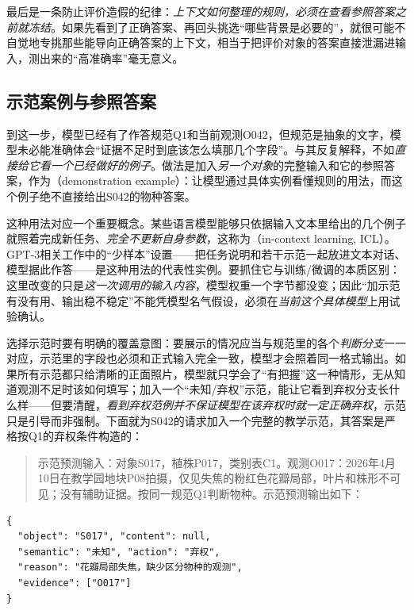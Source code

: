 最后是一条防止评价造假的纪律：\emph{上下文如何整理的规则，必须在查看参照答案之前就冻结}。如果先看到了正确答案、再回头挑选“哪些背景是必要的”，就很可能不自觉地专挑那些能导向正确答案的上下文，相当于把评价对象的答案直接泄漏进输入，测出来的“高准确率”毫无意义。

\Needspace{125mm}
\subsection{示范案例与参照答案}
\label{sec:knowledge-acquisition-demonstrations}

到这一步，模型已经有了作答规范Q1和当前观测O042，但规范是抽象的文字，模型未必能准确体会“证据不足时到底该怎么填那几个字段”。与其反复解释，不如\emph{直接给它看一个已经做好的例子}。做法是加入\emph{另一个对象}的完整输入和它的参照答案，作为（demonstration example）：让模型通过具体实例看懂规则的用法，而这个例子绝不直接给出S042的物种答案。

这种用法对应一个重要概念。某些语言模型能够只依据输入文本里给出的几个例子就照着完成新任务、\emph{完全不更新自身参数}，这称为（in-context learning, ICL）。GPT-3相关工作中的“少样本”设置——把任务说明和若干示范一起放进文本对话、模型据此作答——是这种用法的代表性实例。要抓住它与训练/微调的本质区别：这里改变的只是\emph{这一次调用的输入内容}，模型权重一个字节都没变；因此“加示范有没有用、输出稳不稳定”不能凭模型名气假设，必须在\emph{当前这个具体模型}上用试验确认。

选择示范时要有明确的覆盖意图：要展示的情况应当与规范里的各个\emph{判断分支}一一对应，示范里的字段也必须和正式输入完全一致，模型才会照着同一格式输出。如果所有示范都只给清晰的正面照片，模型就只学会了“有把握”这一种情形，无从知道观测不足时该如何填写；加入一个“未知/弃权”示范，能让它看到弃权分支长什么样——但要清醒，\emph{看到弃权范例并不保证模型在该弃权时就一定正确弃权}，示范只是引导而非强制。下面就为S042的请求加入一个完整的教学示范，其答案是严格按Q1的弃权条件构造的：

\begin{quote}
  示范预测输入：对象S017，植株P017，类别表C1。观测O017：2026年4月10日在教学园地块P08拍摄，仅见失焦的粉红色花瓣局部，叶片和株形不可见；没有辅助证据。按同一规范Q1判断物种。示范预测输出如下：
\end{quote}
\begin{lstlisting}[style=book code,numbers=none]
{
  "object": "S017", "content": null,
  "semantic": "未知", "action": "弃权",
  "reason": "花瓣局部失焦，缺少区分物种的观测",
  "evidence": ["O017"]
}
\end{lstlisting}


